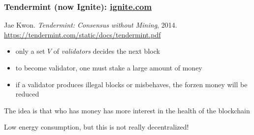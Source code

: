\documentclass[11pt]{beamer}  %
\begin{document}
\begin{frame}\frametitle{Tendermint (now Ignite): \url{ignite.com}}

  \begin{greenbox}{Jae Kwon. \emph{Tendermint: Consensus without Mining}, 2014.\\
    \url{https://tendermint.com/static/docs/tendermint.pdf}}
    \begin{itemize}
    \item only a set $V$ of \emph{validators} decides the next block
    \item to become validator, one must stake a large amount of money
    \item if a validator produces illegal blocks or misbehaves, the forzen money will be reduced
    \end{itemize}
  \end{greenbox}

  \smallskip

  \begin{center}
    The idea is that who has money has more interest in the health of the blockchain
  \end{center}

  \smallskip

  \begin{center}
    Low energy consumption, but this is not really decentralized!
  \end{center}

\end{frame}
\end{document}
